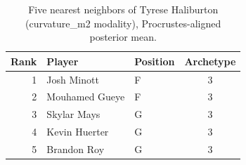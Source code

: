 \begin{table}[htbp]
  \centering\small
  \begin{tabular}{rllc}
    \toprule
    Rank & Player & Position & Archetype \\
    \midrule
    1 & Josh Minott & F & 3 \\
    2 & Mouhamed Gueye & F & 3 \\
    3 & Skylar Mays & G & 3 \\
    4 & Kevin Huerter & G & 3 \\
    5 & Brandon Roy & G & 3 \\
    \bottomrule
  \end{tabular}
  \caption{Five nearest neighbors of Tyrese Haliburton (curvature_m2 modality), Procrustes-aligned posterior mean.}
  \label{tab:Tyrese_Haliburton_neighbors_curvature_m2}
\end{table}

